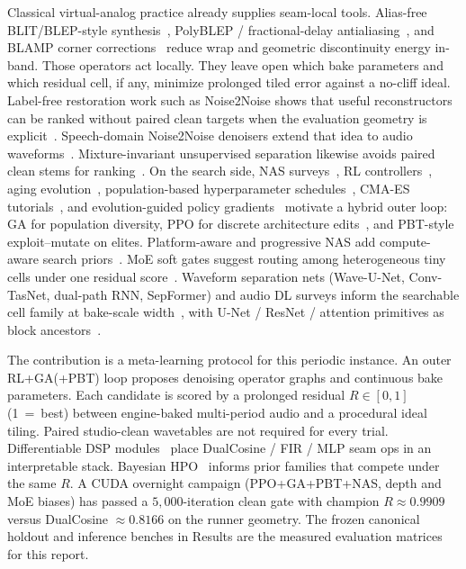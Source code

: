 Classical virtual-analog practice already supplies seam-local tools.
Alias-free BLIT/BLEP-style synthesis~\cite{stilson1996}, PolyBLEP / fractional-delay antialiasing~\cite{nam2009polyblep}, and BLAMP corner corrections~\cite{esqueda2016blamp} reduce wrap and geometric discontinuity energy in-band.
Those operators act locally.
They leave open which bake parameters and which residual cell, if any, minimize prolonged tiled error against a no-cliff ideal.
Label-free restoration work such as Noise2Noise shows that useful reconstructors can be ranked without paired clean targets when the evaluation geometry is explicit~\cite{lehtinen2018}.
Speech-domain Noise2Noise denoisers extend that idea to audio waveforms~\cite{kashyap2021n2n}.
Mixture-invariant unsupervised separation likewise avoids paired clean stems for ranking~\cite{wisdom2020}.
On the search side, NAS surveys~\cite{elsken2019}, RL controllers~\cite{zoph2017nas,pham2018}, aging evolution~\cite{real2017large,real2019}, population-based hyperparameter schedules~\cite{jaderberg2017}, CMA-ES tutorials~\cite{hansen2016cmaes}, and evolution-guided policy gradients~\cite{khadka2018} motivate a hybrid outer loop: GA for population diversity, PPO for discrete architecture edits~\cite{schulman2017}, and PBT-style exploit--mutate on elites.
Platform-aware and progressive NAS add compute-aware search priors~\cite{tan2019mnasnet,liu2018pnas}.
MoE soft gates suggest routing among heterogeneous tiny cells under one residual score~\cite{shazeer2017}.
Waveform separation nets (Wave-U-Net, Conv-TasNet, dual-path RNN, SepFormer) and audio DL surveys inform the searchable cell family at bake-scale width~\cite{stoller2018,macartney2018,luo2019,luo2020dprnn,subakan2021,purwins2019,gong2021ast}, with U-Net / ResNet / attention primitives as block ancestors~\cite{ronneberger2015,he2016resnet,vaswani2017,jansson2017}.

The contribution is a meta-learning protocol for this periodic instance.
An outer RL+GA(+PBT) loop proposes denoising operator graphs and continuous bake parameters.
Each candidate is scored by a prolonged residual $R\in[0,1]$ (1~=~best) between engine-baked multi-period audio and a procedural ideal tiling.
Paired studio-clean wavetables are not required for every trial.
Differentiable DSP modules~\cite{engel2020} place DualCosine / FIR / MLP seam ops in an interpretable stack.
Bayesian HPO~\cite{snoek2012} informs prior families that compete under the same $R$.
A CUDA overnight campaign (PPO+GA+PBT+NAS, depth and MoE biases) has passed a $5{,}000$-iteration clean gate with champion $R\approx 0.9909$ versus DualCosine $\approx 0.8166$ on the runner geometry.
The frozen canonical holdout and inference benches in Results are the measured evaluation matrices for this report.

